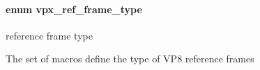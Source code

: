 \paragraph[{\texorpdfstring{vpx\+\_\+ref\+\_\+frame\+\_\+type}{vpx_ref_frame_type}}]{\setlength{\rightskip}{0pt plus 5cm}enum {\bf vpx\+\_\+ref\+\_\+frame\+\_\+type}}\hypertarget{group__vp8_gad8ab72d8a178a68339dad2987358c331}{}\label{group__vp8_gad8ab72d8a178a68339dad2987358c331}


reference frame type 

The set of macros define the type of V\+P8 reference frames 